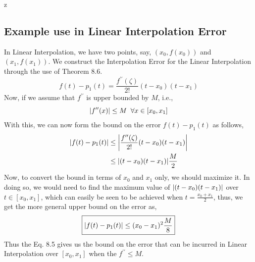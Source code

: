 z\documentclass[a4paper,12pt,twoside]{book}
\DeclarePairedDelimiter\abs{\lvert}{\rvert}
\begin{document}
\subsection{Example use in Linear Interpolation Error}
In Linear Interpolation, we have two points, say, $(x_0, f(x_0))$ and $(x_1, f(x_1))$. We construct the Interpolation Error for the Linear Interpolation through the use of Theorem 8.6.
\[ f(t) - p_1(t) = \frac{f^{\prime\prime}(\zeta)}{2!} (t-x_0)(t-x_1)\]
Now, if we assume that $f^{\prime\prime}$ is upper bounded by $M$, i.e.,
\[\abs*{f^{\prime\prime}(x) } \le M \;\; \forall x \in [x_0,x_1]\]
With this, we can now form the bound on the error $f(t) - p_1(t)$ as follows,
\begin{equation*}
    \begin{split}
        \abs*{f(t) - p_1(t)} &\le \abs*{\frac{f^{\prime\prime}(\zeta)}{2!} (t-x_0)(t-x_1)}\\
        &\le \abs*{(t-x_0)(t-x_1)} \frac{M}{2}\\
    \end{split}
\end{equation*}
Now, to convert the bound in terms of $x_0$ and $x_1$ only, we should maximize it. In doing so, we would need to find the maximum value of $\abs{(t-x_0)(t-x_1)}$ over $t\in[x_0,x_1]$, which can easily be seen to be achieved when $t = \frac{x_0+x_1}{2}$, thus, we get the more general upper bound on the error as,
\begin{equation}
    \boxed{\abs*{f(t) - p_1(t)} \le (x_0-x_1)^2 \frac{M}{8}}
\end{equation}
Thus the Eq. 8.5 gives us the bound on the error that can be incurred in Linear Interpolation over $[x_0,x_1]$ when the $f^{\prime\prime} \le M$.
\end{document}
